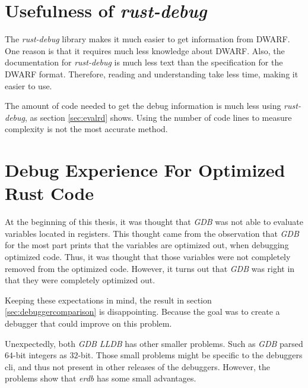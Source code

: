 


\section{Usefulness of \emph{rust-debug}} %
The \emph{rust-debug} library makes it much easier to get information from \gls{DWARF}.
One reason is that it requires much less knowledge about \gls{DWARF}.
Also, the documentation for \emph{rust-debug} is much less text than the specification for the \gls{DWARF} format.
Therefore, reading and understanding take less time, making it easier to use.


The amount of code needed to get the debug information is much less using \emph{rust-debug}, as section \ref{sec:evalrd} shows.
Using the number of code lines to measure complexity is not the most accurate method.



\section{Debug Experience For Optimized Rust Code} %
At the beginning of this thesis, it was thought that \emph{GDB} was not able to evaluate variables located in registers.
This thought came from the observation that \emph{GDB} for the most part prints that the variables are optimized out, when debugging optimized code.
Thus, it was thought that those variables were not completely removed from the optimized code.
However, it turns out that \emph{GDB} was right in that they were completely optimized out.


Keeping these expectations in mind, the result in section \ref{sec:debuggercomparison} is disappointing.
Because the goal was to create a debugger that could improve on this problem.


Unexpectedly, both \emph{GDB} \emph{LLDB} has other smaller problems.
Such as \emph{GDB} parsed $64$-bit integers as $32$-bit.
Those small problems might be specific to the debuggers \gls{cli}, and thus not present in other releases of the debuggers.
However, the problems show that \emph{erdb} has some small advantages.


